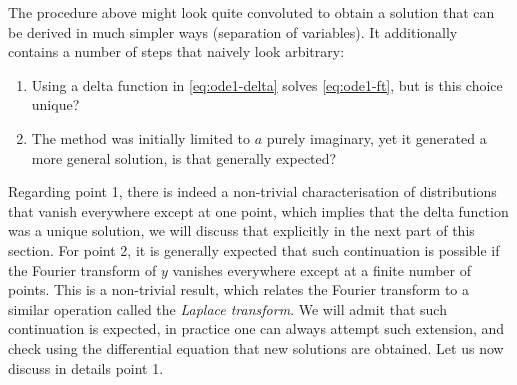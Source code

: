 The procedure above might look quite convoluted to obtain a solution that can be derived
in much simpler ways (\eg separation of variables). It additionally contains a number of
steps that naively look arbitrary:
\begin{enumerate}
  \item Using a delta function in \cref{eq:ode1-delta} solves \cref{eq:ode1-ft}, but is
    this choice unique?
  \item The method was initially limited to $a$ purely imaginary, yet it generated a more
    general solution, is that generally expected?
\end{enumerate}
Regarding point 1, there is indeed a non-trivial characterisation of distributions that
vanish everywhere except at one point, which implies that the delta function was a unique
solution, we will discuss that explicitly in the next part of this section. For point 2,
it is generally expected that such continuation is possible if the Fourier transform of
$y$ vanishes everywhere except at a finite number of points. This is a non-trivial result,
which relates the Fourier transform to a similar operation called the \emph{Laplace
transform}. We will admit that such continuation is expected, in practice one can always
attempt such extension, and check using the differential equation that new solutions are
obtained. Let us now discuss in details point 1.
